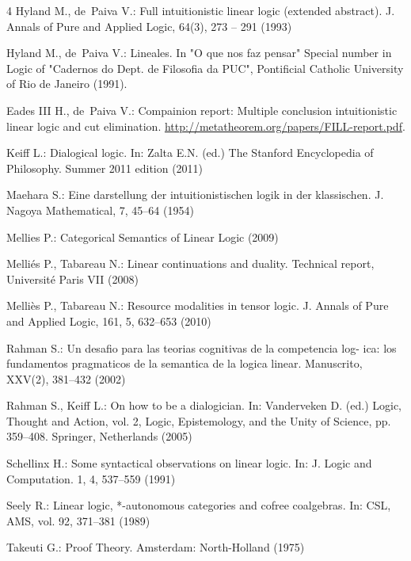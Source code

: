 \documentclass{elsarticle}
\begin{document}
\begin{thebibliography}{4}
 Hyland M., de~Paiva V.: Full intuitionistic
  linear logic (extended abstract). J. Annals of Pure and Applied
  Logic, 64(3), 273 -- 291 (1993)

 Hyland M., de~Paiva V.: Lineales. In "O que nos
  faz pensar" Special number in Logic of "Cadernos do Dept. de
  Filosofia da PUC", Pontificial Catholic University of Rio de
  Janeiro (1991).
  
 Eades III H., de~Paiva V.: Compainion report:
  Multiple conclusion intuitionistic linear logic and cut elimination.
  \url{http://metatheorem.org/papers/FILL-report.pdf}.

 Keiff L.: Dialogical logic. In: Zalta E.N. (ed.)
  The Stanford Encyclopedia of Philosophy. Summer 2011 edition (2011)

 Maehara S.: Eine darstellung der
  intuitionistischen logik in der klassischen. J. Nagoya Mathematical,
  7, 45--64 (1954)

 Mellies P.: Categorical Semantics of Linear
  Logic (2009)

 Melli{\'e}s P., Tabareau N.: Linear
  continuations and duality. Technical report, Universit{\'e} Paris
  VII (2008)

 Melli{\`e}s P., Tabareau N.: Resource
  modalities in tensor logic.  J. Annals of Pure and Applied Logic,
  161, 5, 632--653 (2010)

 Rahman S.: Un desafio para las teorias
  cognitivas de la competencia log- ica: los fundamentos pragmaticos
  de la semantica de la logica linear. Manuscrito, XXV(2), 381--432
  (2002)

 Rahman S., Keiff L.: On how to be a
  dialogician. In: Vanderveken D. (ed.) Logic, Thought and Action,
  vol. 2, Logic, Epistemology, and the Unity of Science,
  pp. 359--408. Springer, Netherlands (2005)

 Schellinx H.: Some syntactical observations
  on linear logic. In: J. Logic and Computation. 1, 4, 537--559 (1991)

 Seely R.: Linear logic, *-autonomous categories
  and cofree coalgebras. In: CSL, AMS, vol. 92, 371--381 (1989)

 Takeuti G.: Proof Theory. Amsterdam:
  North-Holland (1975)

\end{thebibliography}
\end{document}
